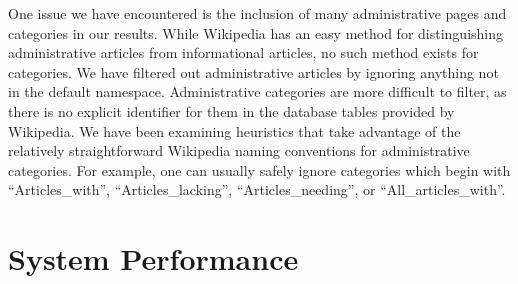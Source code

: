 \documentclass[]{sig-alternate}
\begin{document}
One issue we have encountered is the inclusion of many administrative pages and categories in our results. While Wikipedia has an easy method for distinguishing administrative articles from informational articles, no such method exists for categories. We have filtered out administrative articles by ignoring anything not in the default namespace. Administrative categories are more difficult to filter, as there is no explicit identifier for them in the database tables provided by Wikipedia. We have been examining heuristics that take advantage of the relatively straightforward Wikipedia naming conventions for administrative categories. For example, one can usually safely ignore categories which begin with ``Articles\_with'', ``Articles\_lacking'', ``Articles\_needing'', or ``All\_articles\_with''.

\section{System Performance}
\label{sec:system_performance}
\end{document}
